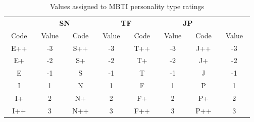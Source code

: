 \begin{table}[h]
\centering
\caption{Values assigned to MBTI personality type ratings \label{tab:mbti_ratings}}
\begin{tabular}{cc|cc|cc|cc}

\hline
\noalign{\smallskip}
\multicolumn{2}{c}{\textbf{IE}}  & \multicolumn{2}{c}{\textbf{SN}} & \multicolumn{2}{c}{\textbf{TF}} & \multicolumn{2}{c}{\textbf{JP}} \\
~Code~ & ~Value~ & ~Code~ & ~Value~ & ~Code~ & ~Value~ & ~Code~ & ~Value~\\
\noalign{\smallskip}
\hline
E++ & -3  & S++ & -3 & T++ & -3 & J++ & -3\\
E+ & -2 & S+ & -2 & T+ & -2 & J+ & -2  \\
E & -1 & S & -1 & T & -1 & J & -1  \\
I & 1 & N & 1 & F & 1 & P & 1 \\
I+ & 2  & N+ & 2 & F+ & 2 & P+ & 2 \\
I++ & 3 & N++  & 3 & F++  & 3 & P++  & 3 \\
\hline
\end{tabular}
\end{table}






